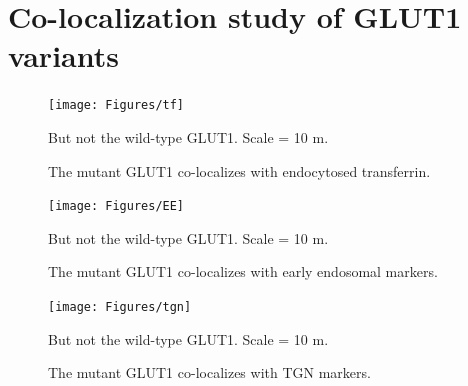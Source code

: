 \section{Co-localization study of GLUT1 variants}
\begin{figure}[h]
\centering
\texttt{[image: Figures/tf]}
\caption{The mutant GLUT1 co-localizes with endocytosed transferrin.}
\vspace*{-3mm}
\small \justify
But not the wild-type GLUT1. Scale = 10 \textmu m.
\label{fig:tf}
\end{figure}

\begin{figure}[h]
\centering
\texttt{[image: Figures/EE]}
\caption{The mutant GLUT1 co-localizes with early endosomal markers.}
\vspace*{-3mm}
\small \justify
But not the wild-type GLUT1. Scale = 10 \textmu m.
\label{fig:ee}
\end{figure}

\begin{figure}[h]
\centering
\texttt{[image: Figures/tgn]}
\caption{The mutant GLUT1 co-localizes with TGN markers.}
\vspace*{-3mm}
\small \justify
But not the wild-type GLUT1. Scale = 10 \textmu m.
\label{fig:tf}
\end{figure}
